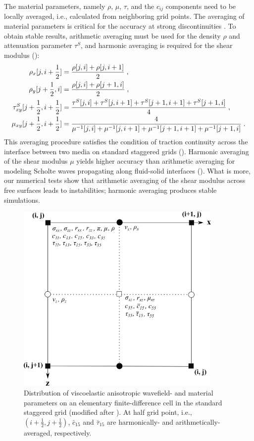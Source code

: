 The material parameters, namely $\rho$, $\mu$, $\tau$, and the $c_{ij}$ components need to be locally averaged, i.e., calculated from neighboring grid points. The averaging of material parameters is critical for the accuracy at strong discontinuities \cite{zahradnik:93,falk:98,moczo:02}. To obtain stable results, arithmetic averaging  must be used for the density $\rho$ and attenuation parameter $\tau^S$, and harmonic averaging is required for the shear modulus (\cite{fellinger:95,graves:96,falk:98,vossen:02,moczo:02}):
\begin{subequations}
\allowdisplaybreaks
    \begin{align}
        \rho_x[j,i+\frac{1}{2}] &= \frac{\rho[j,i]+\rho[j,i+1]}{2}\;,\\
        \rho_y[j+\frac{1}{2},i] &= \frac{\rho[j,i]+\rho[j+1,i]}{2}\;,\\
        \tau^S_{xy}[j+\frac{1}{2},i+\frac{1}{2}] &= \frac{\tau^S[j,i]+\tau^S[j,i+1]+\tau^S[j+1,i+1]+\tau^S[j+1,i]}{4}\;,\\
        \mu_{xy}[j+\frac{1}{2},i+\frac{1}{2}] &= \frac{4}{\mu^{-1}[j,i]+\mu^{-1}[j,i+1]+\mu^{-1}[j+1,i+1]+\mu^{-1}[j+1,i]}\;.
        \label{eq:stress_vti2}
    \end{align}
\end{subequations}
This averaging procedure satisfies the condition of traction continuity across the interface between two media on standard staggered grids (\cite{moczo:02}). Harmonic averaging of the shear modulus $\mu$ yields higher accuracy than arithmetic averaging for modeling Scholte waves propagating along fluid-solid interfaces (\cite{falk:98}). What is more, our numerical tests show that arithmetic averaging of the shear modulus across free surfaces leads to instabilities; harmonic averaging produces stable simulations. 
\begin{figure}[ht!]
    \centering
    \includegraphics[width=10cm]{figures/ssg_final.png}
    \caption{Distribution of viscoelastic anisotropic wavefield- and material parameters on an elementary finite-difference cell in the standard staggered grid (modified after \cite{virieux:86}).
    At half grid point, i.e., $(i+\frac{1}{2},j+\frac{1}{2})$, $\bar{c}_{15}$ and $\bar{\tau}_{15}$ are harmonically- and arithmetically-averaged, respectively.}
    \label{fig:ssg}
\end{figure}

